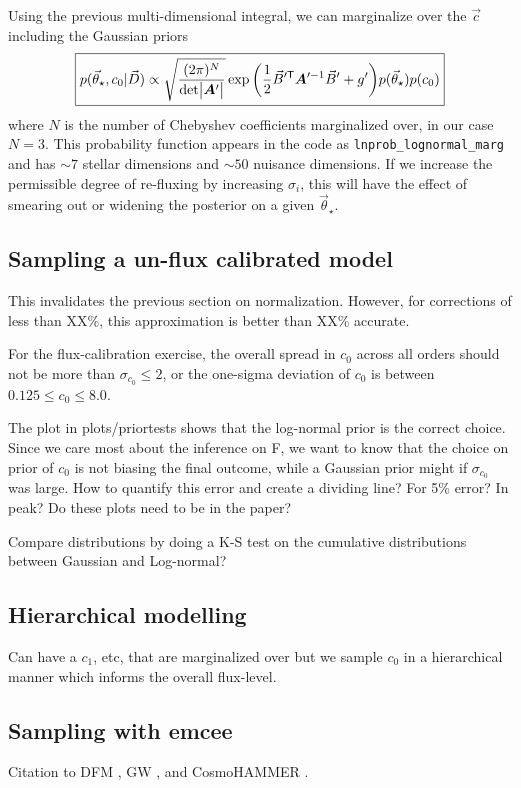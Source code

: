 \documentclass[preprint]{aastex} %
\newcommand{\vt}{\vec{\theta}}
\newcommand{\vstar}{\vt_{\star}}
\newcommand{\vc}{\vec{c}}
\newcommand{\vD}{\vec{D}}
\newcommand{\trans}{\mathsf{T}}
\begin{document}
Using the previous multi-dimensional integral, we can marginalize over the $\vc$ including the Gaussian priors
\begin{equation}
  \boxed{
  p(\vstar, c_0 | \vD) \propto \sqrt{\frac{(2 \pi )^N}{ {\rm det} \bigl |{\bm A}^\prime \bigr |}} \exp{ \left ( \frac{1}{2} \vec{B}^{\prime\trans} {\bm A}^{\prime -1} \vec{B}^\prime + g^\prime \right )} p(\vstar) p(c_0)
}
\end{equation}
where $N$ is the number of Chebyshev coefficients marginalized over, in our case $N=3$. This probability function appears in the code as \texttt{lnprob\_lognormal\_marg} and has $\sim 7$ stellar dimensions and $\sim 50$ nuisance dimensions. If we increase the permissible degree of re-fluxing by increasing $\sigma_i$, this will have the effect of smearing out or widening the posterior on a given $\vstar$.



\subsection{Sampling a un-flux calibrated model}
This invalidates the previous section on normalization. However, for corrections of less than XX\%, this approximation is better than XX\% accurate.

For the flux-calibration exercise, the overall spread in $c_0$ across all orders should not be more than $\sigma_{c_0} \leq 2$, or the one-sigma deviation of $c_0$ is between $0.125 \leq c_0 \leq 8.0$.

The plot in plots/priortests shows that the log-normal prior is the correct choice. Since we care most about the inference on F, we want to know that the choice on prior of $c_0$ is not biasing the final outcome, while a Gaussian prior might if $\sigma_{c_0}$ was large. How to quantify this error and create a dividing line? For 5\% error? In peak? Do these plots need to be in the paper?
 
Compare distributions by doing a K-S test on the cumulative distributions between Gaussian and Log-normal?

\subsection{Hierarchical modelling}
Can have a $c_1$, etc, that are marginalized over but we sample $c_0$ in a hierarchical manner which informs the overall flux-level.

\subsection{Sampling with emcee}
Citation to DFM \citep{fhl+12}, GW \citep{gw10}, and CosmoHAMMER \citep{asa+13}.
\end{document}
